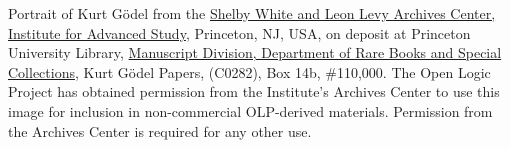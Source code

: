 Portrait of Kurt G\"odel from
the \href{https://library.ias.edu/archives}{Shelby White and Leon Levy
Archives Center, Institute for Advanced Study}, Princeton, NJ, USA, on
deposit at Princeton University
Library, \href{http://rbsc.princeton.edu/divisions/manuscripts-division}{Manuscript
Division, Department of Rare Books and Special Collections}, Kurt
G\"odel Papers, (C0282), Box 14b, \#110,000.  The Open Logic Project
has obtained permission from the Institute's Archives Center to use
this image for inclusion in non-commercial OLP-derived materials.
Permission from the Archives Center is required for any other use.
